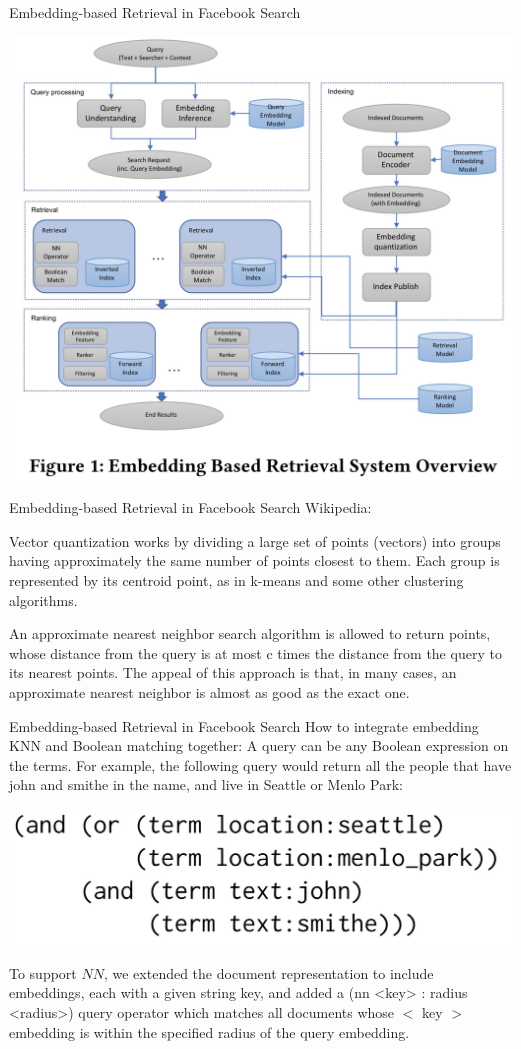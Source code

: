 \documentclass{beamer}
\begin{document}
\begin{frame}{Embedding-based Retrieval in Facebook Search}
    \begin{center}
        \includegraphics[width=0.7\linewidth]{Retrieval1.png}
    \end{center}
\end{frame}

\begin{frame}{Embedding-based Retrieval in Facebook Search}
    Wikipedia:
    
    Vector quantization works by dividing a large set of points (vectors) into groups having approximately the same number of points closest to them. Each group is represented by its centroid point, as in k-means and some other clustering algorithms.
    
    An approximate nearest neighbor search algorithm is allowed to return points, whose distance from the query is at most c times the distance from the query to its nearest points. The appeal of this approach is that, in many cases, an approximate nearest neighbor is almost as good as the exact one. 

\end{frame}

\begin{frame}{Embedding-based Retrieval in Facebook Search}
How to integrate embedding KNN and Boolean matching together:
 A query can be any Boolean expression on the terms. For example, the following query would return all the people that have john and smithe in the name, and live in Seattle or Menlo Park:
 
    \includegraphics[width=0.7\linewidth]{Retrieval2.png}

To support $NN$, we extended the document representation to include embeddings, each with a given string key, and added a (nn <key> : radius <radius>) query operator which matches all documents whose $<$ key $>$ embedding is within the specified radius of the query embedding.

\end{frame}
\end{document}
